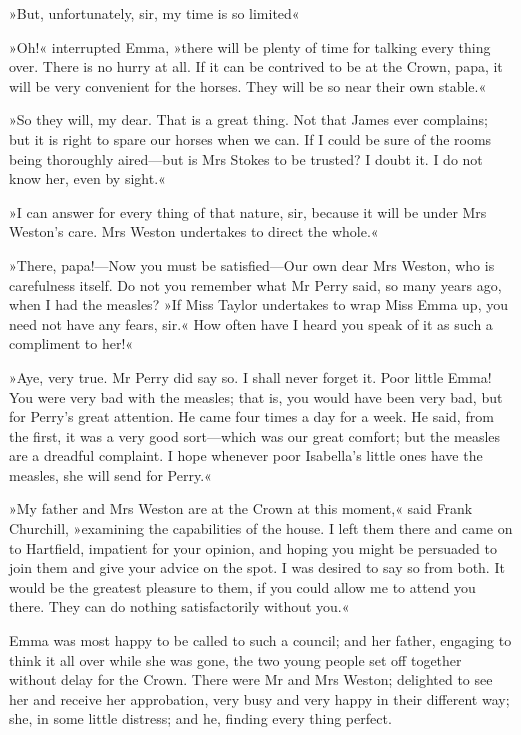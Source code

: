 »But, unfortunately, sir, my time is so limited\longdash«

»Oh!« interrupted Emma, »there will be plenty of time for talking every thing over. There is no hurry at all. If it can be contrived to be at the Crown, papa, it will be very convenient for the horses. They will be so near their own stable.«

»So they will, my dear. That is a great thing. Not that James ever complains; but it is right to spare our horses when we can. If I could be sure of the rooms being thoroughly aired—but is Mrs Stokes to be trusted? I doubt it. I do not know her, even by sight.«

»I can answer for every thing of that nature, sir, because it will be under Mrs Weston's care. Mrs Weston undertakes to direct the whole.«

»There, papa!—Now you must be satisfied—Our own dear Mrs Weston, who is carefulness itself. Do not you remember what Mr Perry said, so many years ago, when I had the measles? »If Miss Taylor undertakes to wrap Miss Emma up, you need not have any fears, sir.« How often have I heard you speak of it as such a compliment to her!«

»Aye, very true. Mr Perry did say so. I shall never forget it. Poor little Emma! You were very bad with the measles; that is, you would have been very bad, but for Perry's great attention. He came four times a day for a week. He said, from the first, it was a very good sort—which was our great comfort; but the measles are a dreadful complaint. I hope whenever poor Isabella's little ones have the measles, she will send for Perry.«

»My father and Mrs Weston are at the Crown at this moment,« said Frank Churchill, »examining the capabilities of the house. I left them there and came on to Hartfield, impatient for your opinion, and hoping you might be persuaded to join them and give your advice on the spot. I was desired to say so from both. It would be the greatest pleasure to them, if you could allow me to attend you there. They can do nothing satisfactorily without you.«

Emma was most happy to be called to such a council; and her father, engaging to think it all over while she was gone, the two young people set off together without delay for the Crown. There were Mr and Mrs Weston; delighted to see her and receive her approbation, very busy and very happy in their different way; she, in some little distress; and he, finding every thing perfect.

